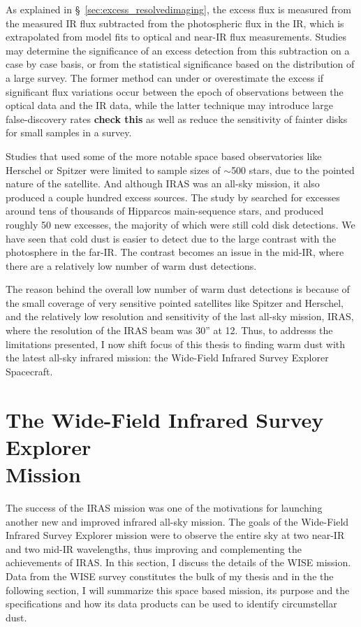    As explained in \S~\ref{sec:excess_resolvedimaging}, the excess flux is measured from the measured IR flux subtracted from the photospheric flux in the IR, which is extrapolated from model fits to optical and near-IR flux measurements. Studies may determine the significance of an excess detection from this subtraction on a case by case basis, or from the statistical significance based on the distribution of a large survey. The former method can under or overestimate the excess if significant flux variations occur between the epoch of observations between the optical data and the IR data, while the latter technique may introduce large false-discovery rates \textbf{check this} as well as reduce the sensitivity of fainter disks for small samples in a survey. 
   
   Studies that used some of the more notable space based observatories like Herschel or Spitzer were limited to sample sizes of $\sim$500 stars, due to the pointed nature of the satellite. And although IRAS was an all-sky mission, it also produced a couple hundred excess sources. The study by \citet{Rhee2007} searched for excesses around tens of thousands of Hipparcos main-sequence stars, and produced roughly 50 new excesses, the majority of which were still cold disk detections. We have seen that cold dust is easier to detect due to the large contrast with the photosphere in the far-IR. The contrast becomes an issue in the mid-IR, where there are a relatively low number of warm dust detections.
   
   The reason behind the overall low number of warm dust detections is because of the small coverage of very sensitive pointed satellites like Spitzer and Herschel, and the relatively low resolution and sensitivity of the last all-sky mission, IRAS, where the resolution of the IRAS beam was 30'' at 12\micron. Thus, to addresss the limitations presented, I now shift focus of this thesis to finding warm dust with the latest all-sky infrared mission: the Wide-Field Infrared Survey Explorer Spacecraft.
   
   
\section{The Wide-Field Infrared Survey Explorer\\ Mission}\label{sec:wise_intro}

    The success of the IRAS mission was one of the motivations for launching another new and improved infrared all-sky mission. The goals of the Wide-Field Infrared Survey Explorer mission \citep[WISE;][]{Wright2010} were to observe the entire sky at two near-IR and two mid-IR wavelengths, thus improving and complementing the achievements of IRAS. In this section, I discuss the details of the WISE mission. Data from the WISE survey constitutes the bulk of my thesis and in the the following section, I will summarize this space based mission, its purpose and the specifications and how its data products can be used to identify circumstellar dust.
   

